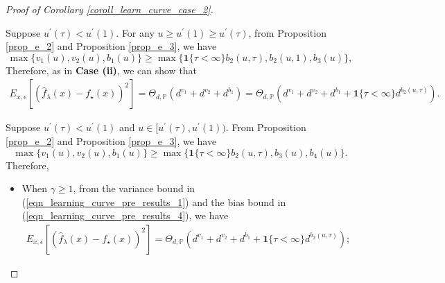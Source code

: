 \documentclass{article}
\theoremstyle{plain}
\theoremstyle{definition}
\theoremstyle{remark}
\begin{document}
\begin{appendix}
\begin{proof}[Proof of Corollary \ref{coroll_learn_curve_case_2}]
\begin{itemize}
\end{itemize}



 Suppose $u^{\prime}(\tau) < u^{\prime}(1)$. For any $u \geq u^{\prime}(1) \geq u^{\prime}(\tau)$, from Proposition \ref{prop_e_2} and Proposition \ref{prop_e_3}, we have
\begin{equation*}
    \max\{v_1(u), v_2(u), b_1(u)\} \geq \max\{\mathbf{1}\{\tau<\infty\}b_2(u, \tau), b_2(u, 1), b_3(u)\},
\end{equation*}
Therefore, as in {\bf Case (ii)}, we can show that
\begin{align*}
E_{x, \epsilon} \left[ \left(\hat{f}_{\lambda}(x) - f_{\star}(x) \right)^{2} \right]
=
\Theta_{d, \mathbb{P}} \left( d^{v_1} + d^{v_2} + d^{b_1}\right)
=
\Theta_{d, \mathbb{P}} \left( d^{v_1} + d^{v_2} + d^{b_1} + \mathbf{1}\{\tau<\infty\}d^{b_2(u, \tau)}\right).
\end{align*}


 Suppose $u^{\prime}(\tau) < u^{\prime}(1)$ and $u \in [u^{\prime}(\tau), u^{\prime}(1))$. From Proposition \ref{prop_e_2} and Proposition \ref{prop_e_3}, we have
\begin{equation}
\label{eqn_tau_finite_b234_bound}
    \max\{v_1(u), v_2(u), b_1(u)\} \geq \max\{\mathbf{1}\{\tau<\infty\}b_2(u, \tau), b_3(u), b_4(u)\}.
\end{equation}
Therefore, 
\begin{itemize}
    \item[(a)] When $\gamma \geq 1$, from the variance bound in (\ref{eqn_learning_curve_pre_results_1}) and the bias bound in (\ref{eqn_learning_curve_pre_results_4}), we have
    \begin{align*}
E_{x, \epsilon} \left[ \left(\hat{f}_{\lambda}(x) - f_{\star}(x) \right)^{2} \right]
=
\Theta_{d, \mathbb{P}} \left( d^{v_1} + d^{v_2} + d^{b_1} + \mathbf{1}\{\tau<\infty\}d^{b_2(u, \tau)}\right);
\end{align*}


\end{itemize}
\end{proof}
\end{appendix}
\end{document}
